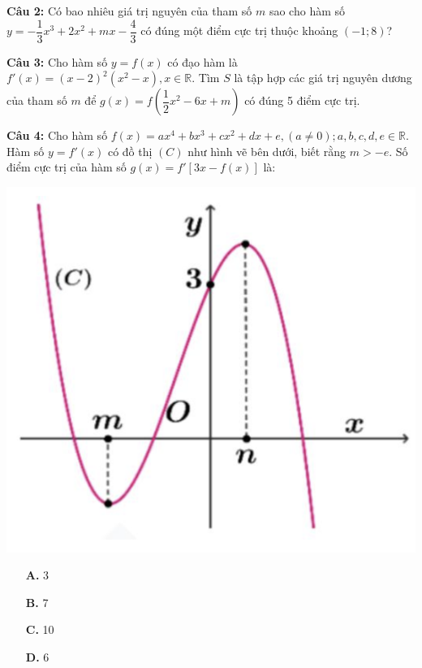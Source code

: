 \documentclass[12pt, a4paper]{article}
\begin{document}
		\textbf{Câu 2: } Có bao nhiêu giá trị nguyên của tham số $m$ sao cho hàm số $y=-\dfrac{1}{3}x^3+2x^2+mx-\dfrac{4}{3}$ có đúng một điểm cực trị thuộc khoảng $(-1;8)$?
		
		\textbf{Câu 3: } Cho hàm số $y=f(x)$ có đạo hàm là $f'(x)=(x-2)^2(x^2-x), x \in \mathbb{R}$. Tìm $S$ là tập hợp các giá trị nguyên dương của tham số $m$ để $g(x)=f\left(\dfrac{1}{2}x^2-6x+m\right)$ có đúng 5 điểm cực trị.
	
		\textbf{Câu 4: } Cho hàm số $f(x)=ax^4+bx^3+cx^2+dx+e, (a \neq 0); a,b,c,d,e \in \mathbb{R}$. Hàm số $y=f'(x)$ có đồ thị $(C)$ như hình vẽ bên dưới, biết rằng $m>-e$. Số điểm cực trị của hàm số $g(x)=f'[3x-f(x)]$ là:
		
\vspace{-0.45cm}

			\begin{center}
				\includegraphics[scale=0.53]{../images/cuctri_cau4.png}
			\end{center}
	
\vspace{-0.8cm}		
	
		\begin{multicols}{4}
			\begin{enumerate}
				\item[\textbf{A.}] 3
				\item[\textbf{B.}] 7
				\item[\textbf{C.}] 10
				\item[\textbf{D.}] 6
			\end{enumerate}
		\end{multicols}
		
\end{document}
